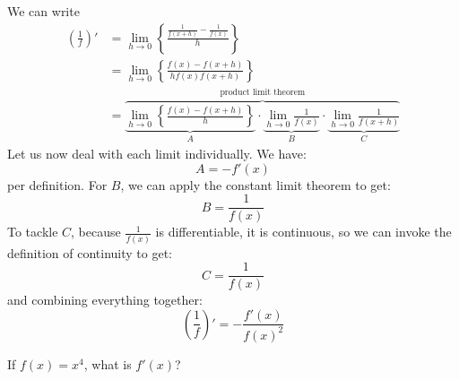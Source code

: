 \begin{itemize}
\begin{theorem}
\begin{equation}
        \end{equation}
    \end{theorem}
    \begin{prooof}
        We can write
        \begin{align}
            \left(\frac{1}{f}\right)'&=\lim_{h\to 0} \left\{\frac{\frac{1}{f(x+h)}-\frac{1}{f(x)}}{h}\right\} \\ 
            &= \lim_{h\to 0}\left\{\frac{f(x)-f(x+h)}{hf(x)f(x+h)}\right\} \\ 
            &= \overbrace{\underbrace{\lim_{h\to 0}\left\{\frac{f(x)-f(x+h)}{h}\right\}}_{A}\cdot\underbrace{\lim_{h\to 0} \frac{1}{f(x)}}_B \cdot\underbrace{\lim_{h\to 0} \frac{1}{f(x+h)}}_C}^\text{product limit theorem}
        \end{align}
        Let us now deal with each limit individually. We have:
        \begin{equation}
            A = -f'(x)
            \label{eq:}
        \end{equation}
        per definition. For $B$, we can apply the constant limit theorem to get:
        \begin{equation}
            B = \frac{1}{f(x)}
            \label{eq:}
        \end{equation}
        To tackle $C$, because $\frac{1}{f(x)}$ is differentiable, it is continuous, so we can invoke the definition of continuity to get:
        \begin{equation}
            C=\frac{1}{f(x)}
            \label{eq:}
        \end{equation}
        and combining everything together:
        \begin{equation}
            \left(\frac{1}{f}\right)'=-\frac{f'(x)}{f(x)^2}
            \label{eq:}
        \end{equation}
    \end{prooof}
    \begin{example}
        If $f(x)=x^4$, what is $f'(x)$?
        \vspace{2mm}


\end{example}
\end{itemize}
